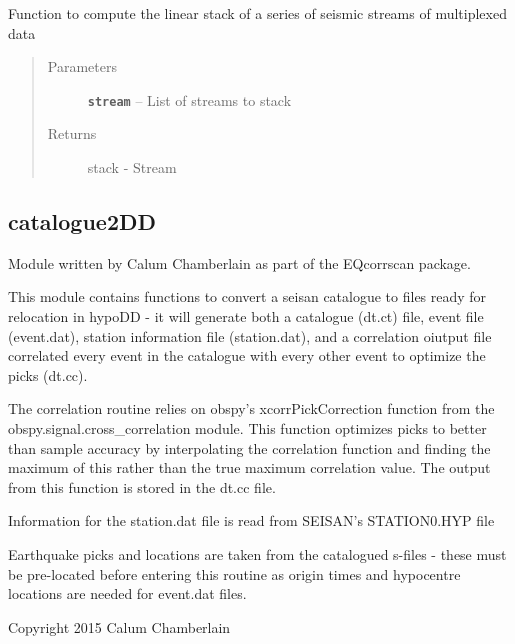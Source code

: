 \documentclass[a4paper,10pt,english]{sphinxmanual}
\begin{document}

\begin{fulllineitems}
\label{utils:stacking.linstack}
Function to compute the linear stack of a series of seismic streams of
multiplexed data
\begin{quote}\begin{description}
\item[{Parameters}] \leavevmode
\textbf{\texttt{stream}} -- List of streams to stack

\item[{Returns}] \leavevmode
stack - Stream

\end{description}\end{quote}

\end{fulllineitems}



\subsection{catalogue2DD}
\label{utils:module-catalogue2DD}\label{utils:catalogue2dd}
Module written by Calum Chamberlain as part of the EQcorrscan package.

This module contains functions to convert a seisan catalogue to files ready for
relocation in hypoDD - it will generate both a catalogue (dt.ct) file, event
file (event.dat), station information file (station.dat), and a correlation
oiutput file correlated every event in the catalogue with every other event to
optimize the picks (dt.cc).

The correlation routine relies on obspy's xcorrPickCorrection function from the
obspy.signal.cross\_correlation module.  This function optimizes picks to better
than sample accuracy by interpolating the correlation function and finding the
maximum of this rather than the true maximum correlation value.  The output
from this function is stored in the dt.cc file.

Information for the station.dat file is read from SEISAN's STATION0.HYP file

Earthquake picks and locations are taken from the catalogued s-files - these
must be pre-located before entering this routine as origin times and hypocentre
locations are needed for event.dat files.

Copyright 2015 Calum Chamberlain
\end{document}
